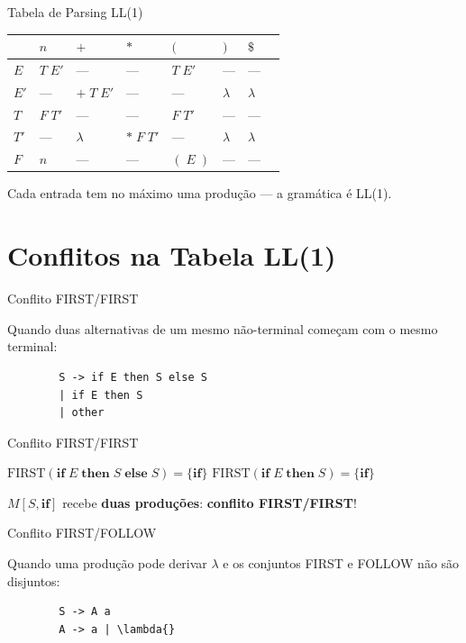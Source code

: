 \begin{frame}{Tabela de Parsing LL(1)}

    \begin{table}
        \begin{tabular}{l l l l l l l l}
            \hline
 & \(n\) & \(+\) & \(*\) & \((\) & \()\) & \(\$\) \\
\hline
\(E\) & \(T\;E'\) & --- & --- & \(T\;E'\) & --- & --- \\
\(E'\) & --- & \(+\;T\;E'\) & --- & --- & \(\lambda\) & \(\lambda\) \\
\(T\) & \(F\;T'\) & --- & --- & \(F\;T'\) & --- & --- \\
\(T'\) & --- & \(\lambda\) & \(*\;F\;T'\) & --- & \(\lambda\) &
\(\lambda\) \\
\(F\) & \(n\) & --- & --- & \((\;E\;)\) & --- & --- \\
\hline
\end{tabular}
\end{table}

Cada entrada tem no máximo uma produção --- a gramática é LL(1).
\end{frame}


\section{Conflitos na Tabela LL(1)}\label{conflitos-na-tabela-ll1}

\begin{frame}[fragile]{Conflito FIRST/FIRST}

    Quando duas alternativas de um mesmo não-terminal começam com o mesmo
    terminal:

    \begin{lstlisting}
        S -> if E then S else S
        | if E then S
        | other
    \end{lstlisting}
\end{frame}

\begin{frame}{Conflito FIRST/FIRST}

    \(\mathrm{FIRST}(\mathbf{if}\;E\;\mathbf{then}\;S\;\mathbf{else}\;S) = \{\mathbf{if}\}\)
    \(\mathrm{FIRST}(\mathbf{if}\;E\;\mathbf{then}\;S) = \{\mathbf{if}\}\)

    \(M[S, \mathbf{if}]\) recebe \textbf{duas produções}: \textbf{conflito
    FIRST/FIRST}!
\end{frame}

\begin{frame}[fragile]{Conflito FIRST/FOLLOW}

    Quando uma produção pode derivar \(\lambda\) e os conjuntos FIRST e
    FOLLOW não são disjuntos:

    \begin{lstlisting}
        S -> A a
        A -> a | \lambda{}
    \end{lstlisting}
\end{frame}

